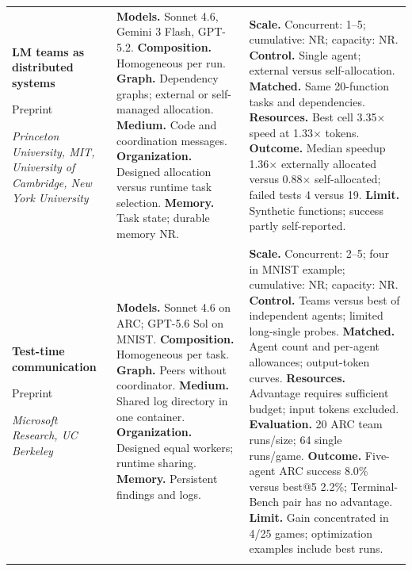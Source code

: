 \begin{longtable}{@{}>{\raggedright\arraybackslash}p{}>{\raggedright\arraybackslash}p{}>{\raggedright\arraybackslash}p{}@{}}
\textbf{LM teams as distributed systems}\par \citep{lm-teams-distributed-systems}\par Preprint\par\emph{Princeton University, MIT, University of Cambridge, New York University} & \textbf{Models.} Sonnet 4.6, Gemini 3 Flash, GPT-5.2. \textbf{Composition.} Homogeneous per run. \textbf{Graph.} Dependency graphs; external or self-managed allocation. \textbf{Medium.} Code and coordination messages. \textbf{Organization.} Designed allocation versus runtime task selection. \textbf{Memory.} Task state; durable memory NR. & \textbf{Scale.} Concurrent: 1--5; cumulative: NR; capacity: NR. \textbf{Control.} Single agent; external versus self-allocation. \textbf{Matched.} Same 20-function tasks and dependencies. \textbf{Resources.} Best cell 3.35$\times$ speed at 1.33$\times$ tokens. \textbf{Outcome.} Median speedup 1.36$\times$ externally allocated versus 0.88$\times$ self-allocated; failed tests 4 versus 19. \textbf{Limit.} Synthetic functions; success partly self-reported. \\ \addlinespace[5pt]
\textbf{Test-time communication}\par \citep{test-time-communication}\par Preprint\par\emph{Microsoft Research, UC Berkeley} & \textbf{Models.} Sonnet 4.6 on ARC; GPT-5.6 Sol on MNIST. \textbf{Composition.} Homogeneous per task. \textbf{Graph.} Peers without coordinator. \textbf{Medium.} Shared log directory in one container. \textbf{Organization.} Designed equal workers; runtime sharing. \textbf{Memory.} Persistent findings and logs. & \textbf{Scale.} Concurrent: 2--5; four in MNIST example; cumulative: NR; capacity: NR. \textbf{Control.} Teams versus best of independent agents; limited long-single probes. \textbf{Matched.} Agent count and per-agent allowances; output-token curves. \textbf{Resources.} Advantage requires sufficient budget; input tokens excluded. \textbf{Evaluation.} 20 ARC team runs/size; 64 single runs/game. \textbf{Outcome.} Five-agent ARC success 8.0\% versus best@5 2.2\%; Terminal-Bench pair has no advantage. \textbf{Limit.} Gain concentrated in 4/25 games; optimization examples include best runs. \\ \addlinespace[5pt]

\end{longtable}
